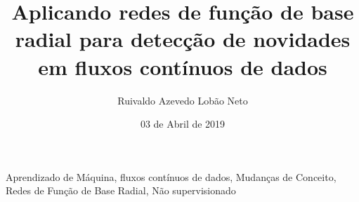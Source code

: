 \documentclass[qual, classic, a4paper]{ufbathesis}
\institute{Instituto de Matem\'{a}tica}
\title{Aplicando redes de função de base radial para detecção de novidades em fluxos contínuos de dados}
\date{03 de Abril de 2019}
\author{Ruivaldo Azevedo Lobão Neto}
\begin{document}
\pgcompfrontpage

\frontmatter

\pgcomppresentationpage










\resumo

\blindtext

\begin{keywords}
    Aprendizado de Máquina, fluxos contínuos de dados, Mudanças de Conceito, Redes de Função de Base Radial, Não supervisionado
\end{keywords}
\end{document}
